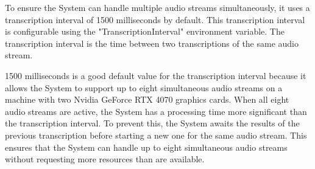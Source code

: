 To ensure the System can handle multiple audio streams simultaneously, it uses a transcription interval of 1500 
milliseconds by default. This transcription interval is configurable using the "TranscriptionInterval" environment 
variable. The transcription interval is the time between two transcriptions of the same audio stream.

1500 milliseconds is a good default value for the transcription interval because it allows the System to support up to 
eight simultaneous audio streams on a machine with two Nvidia GeForce RTX 4070 graphics cards. When all eight audio 
streams are active, the System has a processing time more significant than the transcription interval. To prevent this, 
the System awaits the results of the previous transcription before starting a new one for the same audio stream. This 
ensures that the System can handle up to eight simultaneous audio streams without requesting more resources than are 
available.

